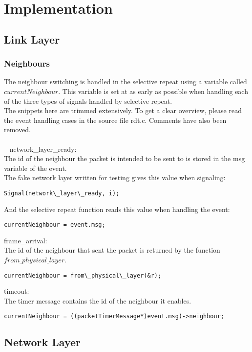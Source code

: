 \section{Implementation}

\subsection{Link Layer}
\subsubsection{Neighbours}
The neighbour switching is handled in the selective repeat using a variable called $currentNeighbour$. This variable is set at as early as possible when handling each of the three types of signals handled by selective repeat.\\
The snippets here are trimmed extensively. To get a clear overview, please read the event handling cases in the source file rdt.c. Comments have also been removed.\\
\\~
network\_layer\_ready:\\
The id of the neighbour the packet is intended to be sent to is stored in the msg variable of the event.\\
The fake network layer written for testing gives this value when signaling:
\begin{lstlisting}
Signal(network\_layer\_ready, i);
\end{lstlisting}
And the selective repeat function reads this value when handling the event:
\begin{lstlisting}
currentNeighbour = event.msg;
\end{lstlisting}

frame\_arrival:\\
The id of the neighbour that sent the packet is returned by the function $from\_physical\_layer$.
\begin{lstlisting}
currentNeighbour = from\_physical\_layer(&r);
\end{lstlisting}

timeout:\\
The timer message contains the id of the neighbour it enables.
\begin{lstlisting}
currentNeighbour = ((packetTimerMessage*)event.msg)->neighbour;
\end{lstlisting}

\subsection{Network Layer}
